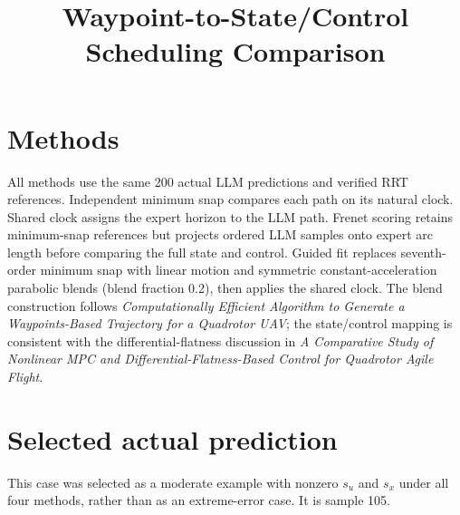 \documentclass[11pt]{article}
\title{Waypoint-to-State/Control Scheduling Comparison}\author{}\date{}
\begin{document}
\maketitle
\section*{Methods}
All methods use the same 200 actual LLM predictions and verified RRT references. Independent minimum snap compares each path on its natural clock. Shared clock assigns the expert horizon to the LLM path. Frenet scoring retains minimum-snap references but projects ordered LLM samples onto expert arc length before comparing the full state and control. Guided fit replaces seventh-order minimum snap with linear motion and symmetric constant-acceleration parabolic blends (blend fraction 0.2), then applies the shared clock. The blend construction follows \emph{Computationally Efficient Algorithm to Generate a Waypoints-Based Trajectory for a Quadrotor UAV}; the state/control mapping is consistent with the differential-flatness discussion in \emph{A Comparative Study of Nonlinear MPC and Differential-Flatness-Based Control for Quadrotor Agile Flight}.
\section*{Selected actual prediction}
This case was selected as a moderate example with nonzero $s_u$ and $s_x$ under all four methods, rather than as an extreme-error case. It is sample 105.
\end{document}
